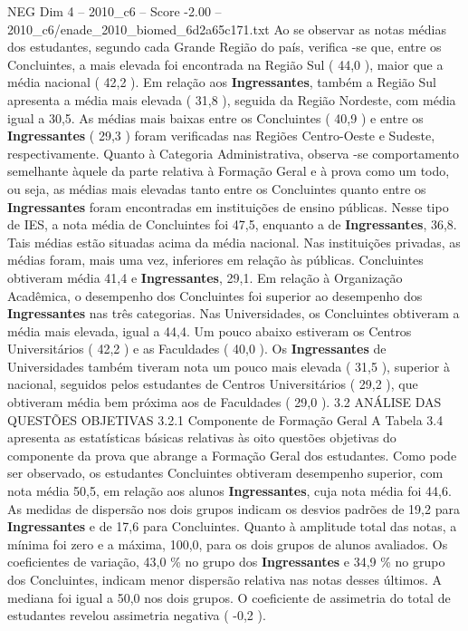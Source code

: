 \begin{textsample}{NEG Dim 4 – 2010\_c6 – Score -2.00 – 2010\_c6/enade\_2010\_biomed\_6d2a65c171.txt}
Ao se observar as notas médias dos estudantes, segundo cada Grande Região do país, verifica -se que, entre os Concluintes, a mais elevada foi encontrada na Região Sul ( 44,0 ), maior que a média nacional ( 42,2 ).
Em relação aos \textbf{Ingressantes}, também a Região Sul apresenta a média mais elevada ( 31,8 ), seguida da Região Nordeste, com média igual a 30,5.
As médias mais baixas entre os Concluintes ( 40,9 ) e entre os \textbf{Ingressantes} ( 29,3 ) foram verificadas nas Regiões Centro-Oeste e Sudeste, respectivamente.
Quanto à Categoria Administrativa, observa -se comportamento semelhante àquele da parte relativa à Formação Geral e à prova como um todo, ou seja, as médias mais elevadas tanto entre os Concluintes quanto entre os \textbf{Ingressantes} foram encontradas em instituições de ensino públicas.
Nesse tipo de IES, a nota média de Concluintes foi 47,5, enquanto a de \textbf{Ingressantes}, 36,8.
Tais médias estão situadas acima da média nacional.
Nas instituições privadas, as médias foram, mais uma vez, inferiores em relação às públicas.
Concluintes obtiveram média 41,4 e \textbf{Ingressantes}, 29,1.
Em relação à Organização Acadêmica, o desempenho dos Concluintes foi superior ao desempenho dos \textbf{Ingressantes} nas três categorias.
Nas Universidades, os Concluintes obtiveram a média mais elevada, igual a 44,4.
Um pouco abaixo estiveram os Centros Universitários ( 42,2 ) e as Faculdades ( 40,0 ).
Os \textbf{Ingressantes} de Universidades também tiveram nota um pouco mais elevada ( 31,5 ), superior à nacional, seguidos pelos estudantes de Centros Universitários ( 29,2 ), que obtiveram média bem próxima aos de Faculdades ( 29,0 ). 3.2 ANÁLISE DAS QUESTÕES OBJETIVAS 3.2.1 Componente de Formação Geral A Tabela 3.4 apresenta as estatísticas básicas relativas às oito questões objetivas do componente da prova que abrange a Formação Geral dos estudantes.
Como pode ser observado, os estudantes Concluintes obtiveram desempenho superior, com nota média 50,5, em relação aos alunos \textbf{Ingressantes}, cuja nota média foi 44,6.
As medidas de dispersão nos dois grupos indicam os desvios padrões de 19,2 para \textbf{Ingressantes} e de 17,6 para Concluintes.
Quanto à amplitude total das notas, a mínima foi zero e a máxima, 100,0, para os dois grupos de alunos avaliados.
Os coeficientes de variação, 43,0 \% no grupo dos \textbf{Ingressantes} e 34,9 \% no grupo dos Concluintes, indicam menor dispersão relativa nas notas desses últimos.
A mediana foi igual a 50,0 nos dois grupos.
O coeficiente de assimetria do total de estudantes revelou assimetria negativa ( -0,2 ).

\end{textsample}
